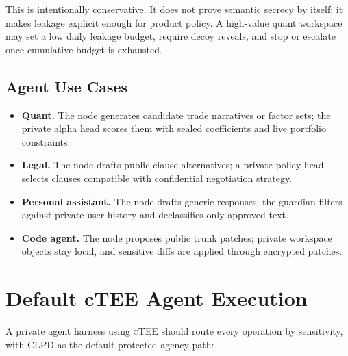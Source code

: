\documentclass[11pt]{article}
\newcommand{\ctee}{\textnormal{\textsc{cTEE}}}
\begin{document}
This is intentionally conservative. It does not prove semantic secrecy by
itself; it makes leakage explicit enough for product policy. A high-value quant
workspace may set a low daily leakage budget, require decoy reveals, and stop
or escalate once cumulative budget is exhausted.

\subsection{Agent Use Cases}

\begin{itemize}[leftmargin=1.5em]
\item \textbf{Quant.} The node generates candidate trade narratives or factor
sets; the private alpha head scores them with sealed coefficients and live
portfolio constraints.
\item \textbf{Legal.} The node drafts public clause alternatives; a private
policy head selects clauses compatible with confidential negotiation strategy.
\item \textbf{Personal assistant.} The node drafts generic responses; the
guardian filters against private user history and declassifies only approved
text.
\item \textbf{Code agent.} The node proposes public trunk patches; private
workspace objects stay local, and sensitive diffs are applied through encrypted
patches.
\end{itemize}

\section{Default cTEE Agent Execution}

A private agent harness using \ctee{} should route every operation by
sensitivity, with CLPD as the default protected-agency path:
\end{document}
